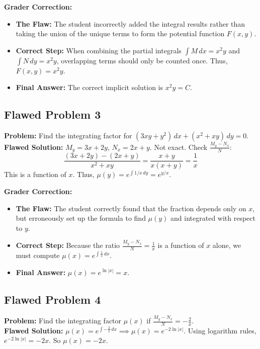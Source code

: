 \documentclass[11pt]{article}
\begin{document}
\textbf{Grader Correction:}
\begin{itemize}
    \item \textbf{The Flaw:} The student incorrectly added the integral results rather than taking the union of the unique terms to form the potential function $F(x, y)$.
    \item \textbf{Correct Step:} When combining the partial integrals $\int M \, dx = x^2y$ and $\int N \, dy = x^2y$, overlapping terms should only be counted once. Thus, $F(x,y) = x^2y$.
    \item \textbf{Final Answer:} The correct implicit solution is $x^2y = C$.
\end{itemize}

\subsection*{Flawed Problem 3}
\textbf{Problem:} Find the integrating factor for $(3xy + y^2) \, dx + (x^2 + xy) \, dy = 0$.
\\
\textbf{Flawed Solution:} $M_y = 3x + 2y$, $N_x = 2x + y$. Not exact. Check $\frac{M_y - N_x}{N}$:
\[ \frac{(3x + 2y) - (2x + y)}{x^2 + xy} = \frac{x + y}{x(x + y)} = \frac{1}{x} \]
This is a function of $x$. Thus, $\mu(y) = e^{\int 1/x \, dy} = e^{y/x}$.

\textbf{Grader Correction:}
\begin{itemize}
    \item \textbf{The Flaw:} The student correctly found that the fraction depends only on $x$, but erroneously set up the formula to find $\mu(y)$ and integrated with respect to $y$.
    \item \textbf{Correct Step:} Because the ratio $\frac{M_y - N_x}{N} = \frac{1}{x}$ is a function of $x$ alone, we must compute $\mu(x) = e^{\int \frac{1}{x} \, dx}$.
    \item \textbf{Final Answer:} $\mu(x) = e^{\ln|x|} = x$.
\end{itemize}

\subsection*{Flawed Problem 4}
\textbf{Problem:} Find the integrating factor $\mu(x)$ if $\frac{M_y - N_x}{N} = -\frac{2}{x}$.
\\
\textbf{Flawed Solution:} $\mu(x) = e^{\int -\frac{2}{x} \, dx} \implies \mu(x) = e^{-2\ln|x|}$. Using logarithm rules, $e^{-2\ln|x|} = -2x$. So $\mu(x) = -2x$.
\end{document}
